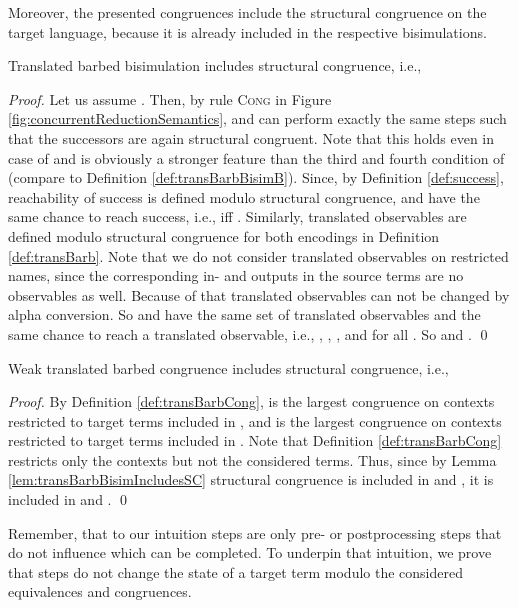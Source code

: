 \documentclass[]{llncs}
\begin{document}
Moreover, the presented congruences include the structural congruence on the target language, because it is already included in the respective bisimulations.

\begin{lemma} \label{lem:transBarbBisimIncludesSC}
	Translated barbed bisimulation includes structural congruence, i.e.,
	
\end{lemma}

\begin{proof}
	Let us assume . Then, by rule \textsc{Cong} in Figure \ref{fig:concurrentReductionSemantics},  and  can perform exactly the same steps such that the successors are again structural congruent. Note that this holds even in case of  and is obviously a stronger feature than the third and fourth condition of  (compare to Definition \ref{def:transBarbBisimB}). Since, by Definition \ref{def:success}, reachability of success is defined modulo structural congruence,  and  have the same chance to reach success, i.e.,  iff . Similarly, translated observables are defined modulo structural congruence for both encodings in Definition \ref{def:transBarb}. Note that we do not consider translated observables on restricted names, since the corresponding in- and outputs in the source terms are no observables as well. Because of that translated observables can not be changed by alpha conversion. So  and  have the same set of translated observables and the same chance to reach a translated observable, i.e., , , , and  for all . So  and .
	\qed
\end{proof}

\begin{lemma} \label{lem:transBarbCongIncludesSC}
	Weak translated barbed congruence includes structural congruence, i.e.,
	
\end{lemma}

\begin{proof}
	By Definition \ref{def:transBarbCong},  is the largest congruence on contexts restricted to target terms included in , and  is the largest congruence on contexts restricted to target terms included in . Note that Definition \ref{def:transBarbCong} restricts only the contexts but not the considered terms. Thus, since by Lemma \ref{lem:transBarbBisimIncludesSC} structural congruence  is included in  and , it is included in  and .
	\qed
\end{proof}

Remember, that to our intuition \pure \admin steps are only pre- or postprocessing steps that do not influence which \simulations can be completed. To underpin that intuition, we prove that \pure \admin steps do not change the state of a target term modulo the considered equivalences and congruences.
\end{document}
